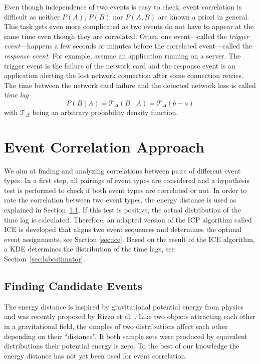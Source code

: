 \documentclass[conference]{IEEEtran}
\theoremstyle{examplestyle}
\begin{document}
Even though independence of two events is easy to check, event correlation is difficult as neither \(P(A)\), \(P(B)\) nor \(P(A, B)\) are known a priori in general. This task gets even more complicated as two events do not have to appear at the same time even though they are correlated. Often, one event---called the \textit{trigger event}---happens a few seconds or minutes before the correlated event---called the \textit{response event}. For example, assume an application running on a server. The trigger event is the failure of the network card and the response event is an application alerting the lost network connection after some connection retries. The time between the network card failure and the detected network loss is called \textit{time lag}
\begin{equation}
	P(B \; | \; A) = \mathcal{T}_\Delta (B \; | \; A) = \mathcal{T}_\Delta (b - a)
\end{equation}
with \(\mathcal{T}_\Delta\) being an arbitrary probability density function.




\section{Event Correlation Approach}
\label{sec:approach}
We aim at finding and analyzing correlations between pairs of different event types. In a first step, all pairings of event types are considered and a hypothesis test is performed to check if both event types are correlated or not. In order to rate the correlation between two event types, the energy distance \cite{Rizzo2016} is used as explained in Section~\ref{sec:energyDistance}. 
If this test is positive, the actual distribution of the time lag is calculated. Therefore, an adapted version of the \ac{ICP} algorithm called \ac{ICE} is developed that aligns two event sequences and determines the optimal event assignments, see Section \ref{sec:ice}.
Based on the result of the \ac{ICE} algorithm, a \ac{KDE} determines the distribution of the time lags, see Section~\ref{sec:labestimator}.




\subsection{Finding Candidate Events}
\label{sec:energyDistance}
The energy distance is inspired by gravitational potential energy from physics and was recently proposed by Rizzo et al. \cite{Rizzo2016}. Like two objects attracting each other in a gravitational field, the samples of two distributions affect each other depending on their ``distance''. If both sample sets were produced by equivalent distributions their potential energy is zero. To the best of our knowledge the energy distance has not yet been used for event correlation.
\end{document}
